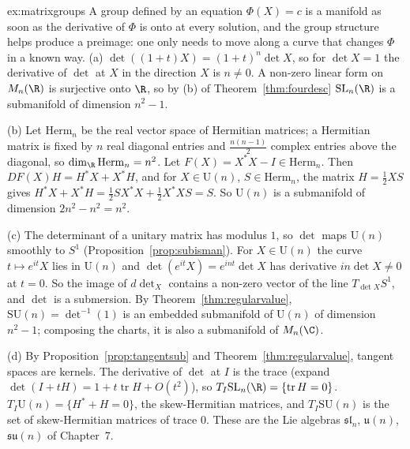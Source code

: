 \begin{solution}{ex:matrixgroups}
\idea A group defined by an equation $\Phi(X)=c$ is a manifold as soon as the derivative of $\Phi$ is onto at every solution, and the group structure
helps produce a preimage: one only needs to move along a curve that changes $\Phi$ in a known way.
\writeup (a) $\det((1+t)X)=(1+t)^n\det X$, so for $\det X=1$ the derivative of $\det$ at $X$ in the direction $X$ is $n\ne0$. A non-zero linear form on
$M_n(\R)$ is surjective onto $\R$, so by (b) of Theorem~\ref{thm:fourdesc} $\mathrm{SL}_n(\R)$ is a submanifold of dimension $n^2-1$.

(b) Let $\mathrm{Herm}_n$ be the real vector space of Hermitian matrices; a Hermitian matrix is fixed by $n$ real diagonal entries and $\frac{n(n-1)}2$
complex entries above the diagonal, so $\dim_\R\mathrm{Herm}_n=n^2$. Let $F(X)=X^*X-I\in\mathrm{Herm}_n$. Then $DF(X)H=H^*X+X^*H$, and for $X\in\mathrm U(n)$,
$S\in\mathrm{Herm}_n$, the matrix $H=\frac12XS$ gives $H^*X+X^*H=\frac12SX^*X+\frac12X^*XS=S$. So $\mathrm U(n)$ is a submanifold of dimension $2n^2-n^2=n^2$.

(c) The determinant of a unitary matrix has modulus $1$, so $\det$ maps $\mathrm U(n)$ smoothly to $S^1$ (Proposition~\ref{prop:subisman}). For
$X\in\mathrm U(n)$ the curve $t\mapsto e^{it}X$ lies in $\mathrm U(n)$ and $\det(e^{it}X)=e^{int}\det X$ has derivative $in\det X\ne0$ at $t=0$. So the image
of $d\det_X$ contains a non-zero vector of the line $T_{\det X}S^1$, and $\det$ is a submersion. By Theorem~\ref{thm:regularvalue},
$\mathrm{SU}(n)=\det^{-1}(1)$ is an embedded submanifold of $\mathrm U(n)$ of dimension $n^2-1$; composing the charts, it is also a submanifold of
$M_n(\C)$.

(d) By Proposition~\ref{prop:tangentsub} and Theorem~\ref{thm:regularvalue}, tangent spaces are kernels. The derivative of $\det$ at $I$ is the trace
(expand $\det(I+tH)=1+t\operatorname{tr}H+O(t^2)$), so $T_I\mathrm{SL}_n(\R)=\{\operatorname{tr}H=0\}$. $T_I\mathrm U(n)=\{H^*+H=0\}$, the skew-Hermitian
matrices, and $T_I\mathrm{SU}(n)$ is the set of skew-Hermitian matrices of trace $0$. These are the Lie algebras $\mathfrak{sl}_n$, $\mathfrak u(n)$,
$\mathfrak{su}(n)$ of Chapter~7.
\end{solution}

